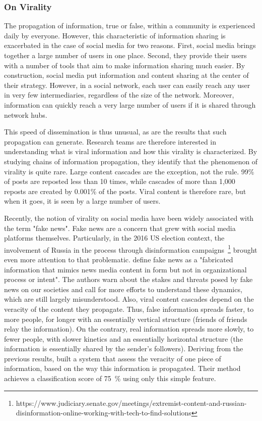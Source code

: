 \subsubsection{On Virality}
The propagation of information, true or false, within a community is experienced daily by everyone.
However, this characteristic of information sharing is exacerbated in the case of social media for two reasons.
First, social media brings together a large number of users in one place.
Second, they provide their users with a number of tools that aim to make information sharing much easier.
By construction, social media put information and content sharing at the center of their strategy.
However, in a social network, each user can easily reach any user in very few intermediaries, regardless of the size of the network.
Moreover, information can quickly reach a very large number of users if it is shared through network hubs.

This speed of dissemination is thus unusual, as are the results that such propagation can generate.
Research teams are therefore interested in understanding what is viral information and how this virality is characterized.
By studying chains of information propagation, they identify that the phenomenon of virality is quite rare.
Large content cascades are the exception, not the rule.
99\% of posts are reposted less than 10 times, while cascades of more than 1,000 reposts are created by 0.001\% of the posts.
Viral content is therefore rare, but when it goes, it is seen by a large number of users.

Recently, the notion of virality on social media have been widely associated with the term "fake news".
Fake news are a concern that grew with social media platforms themselves.
Particularly, in the 2016 US election context, the involvement of Russia in the process through disinformation campaigns~\footnote{https://www.judiciary.senate.gov/meetings/extremist-content-and-russian-disinformation-online-working-with-tech-to-find-solutions}
brought even more attention to that problematic.
\cite{lazerScienceFakeNews2018} define fake news as a "fabricated information that mimics news media content in form but not in organizational process or intent".
The authors warn about the stakes and threats posed by fake news on our societies and call for more efforts to understand these dynamics, which are still largely misunderstood.
Also, viral content cascades depend on the veracity of the content they propagate.
Thus, false information spreads faster, to more people, for longer with an essentially vertical structure (friends of friends relay the information).
On the contrary, real information spreads more slowly, to fewer people, with slower kinetics and an essentially horizontal structure (the information is essentially shared by the sender's followers).
Deriving from the previous results, \cite{vosoughiRumorGaugePredicting2017} built a system that assess the veracity of one piece of information, based on the way this information is propagated.
Their method achieves a classification score of 75~\% using only this simple feature.

